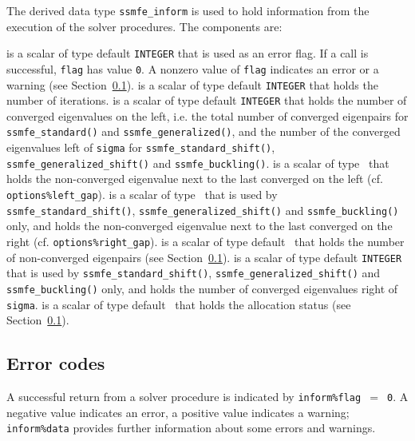 The derived data type {\tt ssmfe\_inform} is used
to hold information from the execution of
the solver procedures.
The components are:

\begin{description}
%
 is a scalar of type default {\tt INTEGER} 
that is used as an error flag.
If a call is successful, {\tt flag} has value {\tt 0}.
A nonzero value of {\tt flag} indicates an error or a warning
(see Section~\ref{sec:err}).
%
 is a scalar of type default {\tt INTEGER} that holds 
the number of iterations.
%
is a scalar of type default {\tt INTEGER} that holds
the number of converged eigenvalues on the left,
i.e. the total number of converged eigenpairs for 
{\tt ssmfe\_standard()} and {\tt ssmfe\_generalized()},
and the number of the converged eigenvalues left of {\tt sigma}
for {\tt ssmfe\_standard\_shift()}, {\tt ssmfe\_generalized\_shift()}
and {\tt ssmfe\_buckling()}.
%
is a scalar of type \REALDP\ that holds
the non-converged eigenvalue next to the last converged on the left
(cf. {\tt options\%left\_gap}).
%
is a scalar of type \REALDP\ that is used by
{\tt ssmfe\_standard\_shift()}, {\tt ssmfe\_generalized\_shift()}
and {\tt ssmfe\_buckling()} only, and holds
the non-converged eigenvalue next to the last converged on the right
(cf. {\tt options\%right\_gap}).
%
is a scalar of type default \Integer\ 
that holds the number of non-converged eigenpairs
(see Section~\ref{sec:err}).
%
is a scalar of type default {\tt INTEGER} that is used by 
{\tt ssmfe\_standard\_shift()}, {\tt ssmfe\_generalized\_shift()}
and {\tt ssmfe\_buckling()} only, and holds
the number of converged eigenvalues right of {\tt sigma}.
%
is a scalar of type default \Integer\ 
that holds the allocation status
(see Section~\ref{sec:err}).
%
\end{description}

\subsection{Error codes}

\label{sec:err}

A successful return from 
a solver procedure
is indicated 
by {\tt inform\%flag $=$ 0}.
A negative value indicates an error, a positive value indicates a warning;
{\tt inform\%data} provides further information
about some errors and warnings. 

